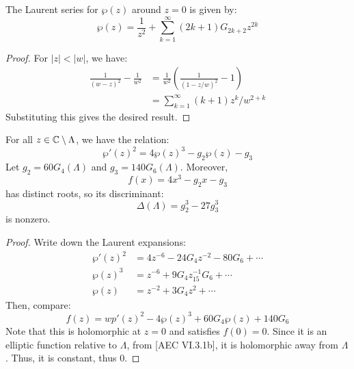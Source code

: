 \documentclass[12pt]{article}
\begin{document}
\begin{prop}
    The Laurent series for $\wp(z)$ around $z = 0$ is given by: 
    \[ \wp(z) = \frac{1}{z^2} + \sum_{k=1}^\infty (2k+1)G_{2k+2}z^{2k} \]
\end{prop}
\begin{proof}
    For $|z| < |w|$, we have:
    \begin{align*}
        \frac{1}{(w-z)^2} - \frac{1}{w^2} &= \frac{1}{w^2}\left(\frac{1}{(1-z/w)^2} - 1\right) \\
        &= \sum_{k=1}^\infty (k+1)z^k/w^{2+k}
    \end{align*}
    Substituting this gives the desired result. 
\end{proof}



\begin{theorem}
    For all $z \in \mathbb C \setminus \Lambda$, we have the relation: 
    \[ \wp'(z)^2 = 4\wp(z)^3 - g_2\wp(z) - g_3\]
    Let $g_2 = 60G_4(\Lambda)$ and $g_3 = 140G_6(\Lambda)$. Moreover,
    \[ f(x) = 4x^3 - g_2x - g_3\]
    has distinct roots, so its discriminant:
    \[ \Delta(\Lambda) = g_2^3 - 27g_3^3\]
    is nonzero. 
\end{theorem}
\begin{proof}
Write down the Laurent expansions: 
    \begin{align*}
        \wp'(z)^2 &= 4z^{-6} -24G_4z^{-2} -80G_6 + \cdots \\
        \wp(z)^3 &= z^{-6} + 9G_4z^{-1} _ 15G_6 + \cdots \\
        \wp(z) &= z^{-2} + 3G_4z^2 + \cdots 
    \end{align*}
        Then, compare: 
        \[ f(z) = wp'(z)^2-4\wp(z)^3+60G_4\wp(z)+140G_6\]
        Note that this is holomorphic at $z = 0$ and satisfies $f(0) = 0$.  Since it is an elliptic function relative to $\Lambda$, from [AEC VI.3.1b], it is holomorphic away from $\Lambda$. Thus, it is constant, thus $0$.
\end{proof}
\end{document}
